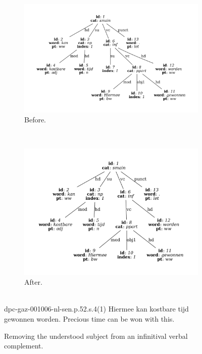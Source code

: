 \begin{figure}
	\centering
	\begin{subfigure}[b]{0.75\textwidth}
		\includegraphics[width=1\textwidth, trim={1.5cm 1.5cm 1.5cm 1.5cm}]{./prebuilt/ua_before.pdf}
		\caption{Before.}
	\end{subfigure}\\[\midsep]
	\begin{subfigure}[b]{0.75\textwidth}
			\includegraphics[width=1\textwidth,trim={1.5cm 1.5cm 1.5cm 1.5cm}]{./prebuilt/ua_after.pdf}
		\caption{After.}			
	\end{subfigure}\\[\smallsep]
	\lassycap
		{dpc-gaz-001006-nl-sen.p.52.s.4(1)}
		{Hiermee kan kostbare tijd gewonnen worden.}
		{Precious time can be won with this.}
	\caption{Removing the understood subject from an infinitival verbal complement.}
	\label{figure:ua}
\end{figure}


